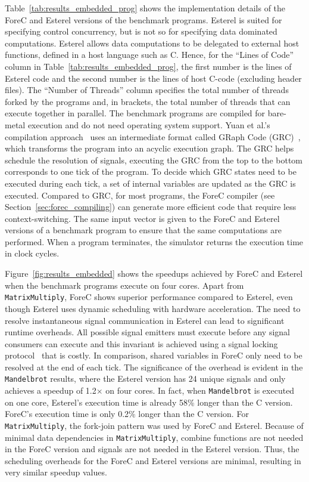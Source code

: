 Table~\ref{tab:results_embedded_prog} shows the
implementation details of the ForeC and Esterel versions of
the benchmark programs. Esterel is suited for specifying
control concurrency, but is not so for specifying
data dominated computations. Esterel allows data 
computations to be delegated to external host functions,
defined in a host language such as C. Hence, for the ``Lines
of Code'' column in Table~\ref{tab:results_embedded_prog},
the first number is the lines of Esterel code and the second
number is the lines of host C-code (excluding header files).
The ``Number of Threads'' column specifies the total number of
threads forked by the programs and, in brackets, the total
number of threads that can execute together in parallel. The
benchmark programs are compiled for bare-metal execution
and do not need operating system support. Yuan et al.'s
compilation approach~\cite{Yuan13} uses an intermediate
format called GRaph Code (GRC)~\cite{timed_compiling_esterel}, which
transforms the program into an acyclic execution graph. The
GRC helps schedule the resolution of signals, executing 
the GRC from the top to the bottom corresponds to one tick
of the program. To decide which GRC states need to be executed during
each tick, a set of internal variables are updated as
the GRC is executed. Compared to GRC, for most programs, the 
ForeC compiler (see Section~\ref{sec:forec_compiling})
can generate more efficient code that require less context-switching.
The same input vector is given to the ForeC and
Esterel versions of a benchmark program to ensure
that the same computations are performed. When a program
terminates, the simulator returns the execution
time in clock cycles.

Figure~\ref{fig:results_embedded} shows the speedups
achieved by ForeC and Esterel when the benchmark programs
execute on four cores. Apart from \verb$MatrixMultiply$,
ForeC shows superior performance compared to Esterel, even
though Esterel uses dynamic scheduling with hardware
acceleration. The need to resolve instantaneous signal
communication in Esterel can lead to significant runtime
overheads. All possible signal emitters must execute before
any signal consumers can execute and this invariant is 
achieved using a signal locking protocol~\cite{Yuan13} that 
is costly. In comparison, shared
variables in ForeC only need to be resolved at the end of
each tick. The significance of the overhead is
evident in the \verb$Mandelbrot$ results, where the Esterel version
has 24 unique signals and only achieves a speedup of
1.2$\times$ on four cores. In fact, when \verb$Mandelbrot$ is
executed on one core, Esterel's execution time is already 58\%
longer than the C version. ForeC's execution time is only
0.2\% longer than the C version. For \verb$MatrixMultiply$, the
fork-join pattern was used by ForeC and Esterel. Because of
minimal data dependencies in \verb$MatrixMultiply$, combine functions
are not needed in the ForeC version and signals
are not needed in the Esterel version. Thus, the scheduling
overheads for the ForeC and Esterel versions are minimal,
resulting in very similar speedup values. 

